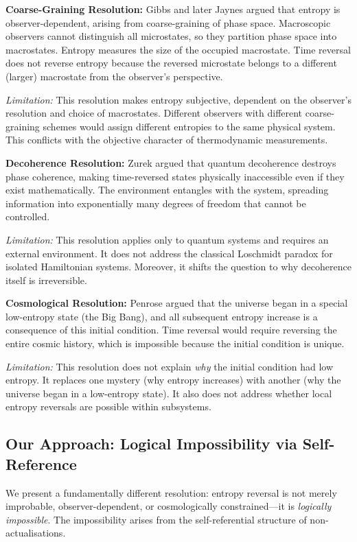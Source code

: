 \documentclass[twocolumn,10pt]{article}
\theoremstyle{definition}
\theoremstyle{remark}
\begin{document}
\textbf{Coarse-Graining Resolution:} Gibbs and later Jaynes \cite{jaynes1957} argued that entropy is observer-dependent, arising from coarse-graining of phase space. Macroscopic observers cannot distinguish all microstates, so they partition phase space into macrostates. Entropy measures the size of the occupied macrostate. Time reversal does not reverse entropy because the reversed microstate belongs to a different (larger) macrostate from the observer's perspective.

\textit{Limitation:} This resolution makes entropy subjective, dependent on the observer's resolution and choice of macrostates. Different observers with different coarse-graining schemes would assign different entropies to the same physical system. This conflicts with the objective character of thermodynamic measurements.

\textbf{Decoherence Resolution:} Zurek \cite{zurek2003} argued that quantum decoherence destroys phase coherence, making time-reversed states physically inaccessible even if they exist mathematically. The environment entangles with the system, spreading information into exponentially many degrees of freedom that cannot be controlled.

\textit{Limitation:} This resolution applies only to quantum systems and requires an external environment. It does not address the classical Loschmidt paradox for isolated Hamiltonian systems. Moreover, it shifts the question to why decoherence itself is irreversible.

\textbf{Cosmological Resolution:} Penrose \cite{penrose1989} argued that the universe began in a special low-entropy state (the Big Bang), and all subsequent entropy increase is a consequence of this initial condition. Time reversal would require reversing the entire cosmic history, which is impossible because the initial condition is unique.

\textit{Limitation:} This resolution does not explain \textit{why} the initial condition had low entropy. It replaces one mystery (why entropy increases) with another (why the universe began in a low-entropy state). It also does not address whether local entropy reversals are possible within subsystems.

\subsection{Our Approach: Logical Impossibility via Self-Reference}

We present a fundamentally different resolution: entropy reversal is not merely improbable, observer-dependent, or cosmologically constrained—it is \textit{logically impossible}. The impossibility arises from the self-referential structure of non-actualisations.
\end{document}
